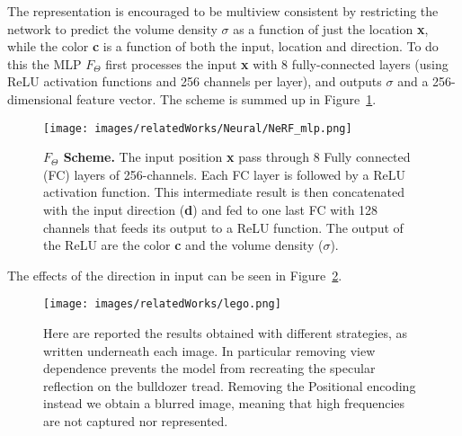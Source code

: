 The representation is encouraged to be multiview consistent by restricting the network to predict the 
volume density $\sigma$ as a function of just the location \textbf{x}, while the color \textbf{c} is a
function of both the input, location and direction. To do this the MLP $F_{\Theta}$ first processes the 
input \textbf{x} with 8 fully-connected layers (using ReLU activation functions and 256 channels per layer),
and outputs $\sigma$ and a 256-dimensional feature vector. The scheme is summed up in Figure~\ref{fig:mlp}.
\begin{figure}[t]
    \centering
    \texttt{[image: images/relatedWorks/Neural/NeRF\_mlp.png]} 
    \caption{\textbf{$F_{\Theta}$ Scheme.} The input position \textbf{x} pass through 8 Fully connected
    (FC) layers of 256-channels. Each FC layer is followed by a ReLU activation function. This intermediate
    result is then concatenated with the input direction (\textbf{d}) and fed to
    one last FC with 128 channels that feeds its output to a ReLU function. The output of the ReLU
    are the color \textbf{c} and the volume density ($\sigma$).}\label{fig:mlp}
\end{figure}

The effects of the direction in input can be seen in Figure~\ref{fig:lego}.
\begin{figure}[t]
    \centering
    \texttt{[image: images/relatedWorks/lego.png]} 
    \caption{Here are reported the results obtained with different strategies, as written underneath each image.
     In particular removing view dependence prevents the model from recreating the specular 
     reflection on the bulldozer tread. Removing the Positional encoding instead we 
     obtain a blurred image, meaning that high frequencies are not captured nor represented.}\label{fig:lego}
\end{figure}

